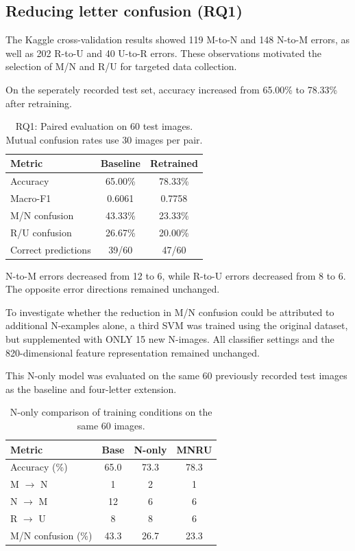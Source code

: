 \documentclass{article}
\begin{document}
\subsection{Reducing letter confusion (RQ1)}
The Kaggle cross-validation results showed 119 M-to-N and 148 N-to-M errors, as well as 202 R-to-U and 40 U-to-R errors. These observations motivated the selection of M/N and R/U for targeted data collection.

On the seperately recorded test set, accuracy increased from 65.00\% to 78.33\% after retraining.
\begin{table}[ht]
\centering
\caption{RQ1: Paired evaluation on 60 test images.
Mutual confusion rates use 30 images per pair.}
\label{tab:rq1_results}
\begin{tabular}{lcc}
\toprule
Metric & Baseline & Retrained \\
\midrule
Accuracy & 65.00\% & 78.33\% \\
Macro-F1 & 0.6061 & 0.7758 \\
M/N confusion & 43.33\% & 23.33\% \\
R/U confusion & 26.67\% & 20.00\% \\
Correct predictions & 39/60 & 47/60 \\
\bottomrule
\end{tabular}
\end{table}

N-to-M errors decreased from 12 to 6, while R-to-U errors decreased from 8 to 6. The opposite error directions remained unchanged.

To investigate whether the reduction in M/N confusion could be attributed to additional N-examples alone, a third SVM was trained using the original dataset, but supplemented with ONLY 15 new N-images. All classifier settings and the 820-dimensional feature representation remained unchanged.

This N-only model was evaluated on the same 60 previously recorded test images as the baseline and four-letter extension.

\begin{table}[ht]
\centering
\caption{N-only comparison of training
conditions on the same 60 images.}
\label{tab:n_only}
\begin{tabular}{lccc}
\toprule
Metric & Base & N-only & MNRU \\
\midrule
Accuracy (\%) & 65.0 & 73.3 & 78.3 \\
M $\rightarrow$ N & 1 & 2 & 1 \\
N $\rightarrow$ M & 12 & 6 & 6 \\
R $\rightarrow$ U & 8 & 8 & 6 \\
M/N confusion (\%) & 43.3 & 26.7 & 23.3 \\
\bottomrule
\end{tabular}
\end{table}
\end{document}

